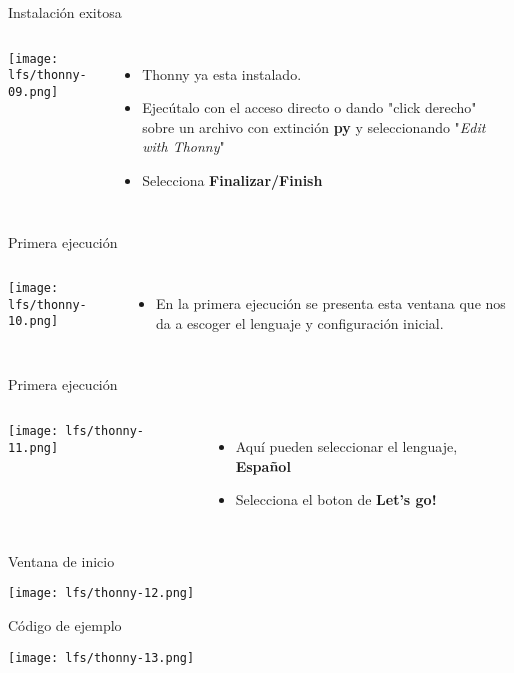 \begin{frame}[c]{Instalación exitosa}
    \begin{columns}
        \begin{center}
            \texttt{[image: lfs/thonny-09.png]}
        \end{center}
        \begin{itemize}
          \item Thonny ya esta instalado.
          \item Ejecútalo con el acceso directo o dando "click derecho"
            sobre un archivo con extinción \textbf{py} y seleccionando
            "\emph{Edit with Thonny}"
          \item Selecciona \textbf{Finalizar/Finish}
        \end{itemize}
    \end{columns}
\end{frame}

\begin{frame}[c]{Primera ejecución}
    \begin{columns}
        \begin{center}
            \texttt{[image: lfs/thonny-10.png]}
        \end{center}
        \begin{itemize}
          \item En la primera ejecución se presenta esta ventana que nos
            da a escoger el lenguaje y configuración inicial.
        \end{itemize}
    \end{columns}
\end{frame}

\begin{frame}[c]{Primera ejecución}
    \begin{columns}
        \begin{center}
            \texttt{[image: lfs/thonny-11.png]}
        \end{center}
        \begin{itemize}
          \item Aquí pueden seleccionar el lenguaje, \textbf{Español}
          \item Selecciona el boton de \textbf{Let's go!}
        \end{itemize}
    \end{columns}
\end{frame}

\begin{frame}[c]{Ventana de inicio}
 \begin{center}
   \texttt{[image: lfs/thonny-12.png]}
 \end{center}
\end{frame}

\begin{frame}[c]{Código de ejemplo}
  \begin{center}
      \texttt{[image: lfs/thonny-13.png]}
  \end{center}
\end{frame}

